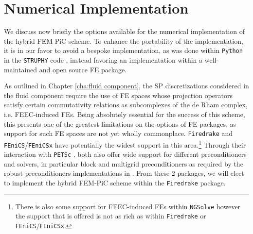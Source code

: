 \chapter{Numerical Implementation}
    We discuss now briefly the options available for the numerical implementation of the hybrid FEM-PiC scheme. To enhance the portability of the implementation, it is in our favor to avoid a bespoke implementation, as was done within {\tt Python} in the {\tt STRUPHY} code \cite{Holderied_Possanner_Wang_2021, Holderied_2022, Li_et_al_2023}, instead favoring an implementation within a well-maintained and open source FE package.
    
    As outlined in Chapter \ref{cha:fluid component}, the SP discretizations considered in the fluid component require the use of FE spaces whose projection operators satisfy certain commutativity relations as subcomplexes of the de Rham complex, i.e. FEEC-induced FEs. Being absolutely essential for the success of this scheme, this presents one of the greatest limitations on the options of FE packages, as support for such FE spaces are not yet wholly commonplace. {\tt Firedrake} \cite{Rathgeber_et_al_2016} and {\tt FEniCS}/{\tt FEniCSx} \cite{Logg_Wells_2010, Logg_Mardal_Wells_2012} have potentially the widest support in this area.\footnote{There is also some support for FEEC-induced FEs within {\tt NGSolve} \cite{Schöberl_2015} however the support that is offered is not as rich as within {\tt Firedrake} or {\tt FEniCS}/{\tt FEniCSx}.} Through their interaction with {\tt PETSc} \cite{Balay_et_al_1997, Balay_et_al_2023}, both also offer wide support for different preconditioners and solvers, in particular block and multigrid preconditioners as required by the robust preconditioners implementations in \cite{Laakmann_Hu_Farrell_2022}. From these 2 packages, we will elect to implement the hybrid FEM-PiC scheme within the {\tt Firedrake} package.

